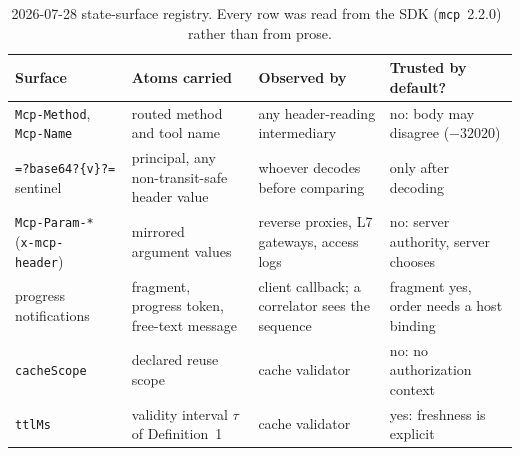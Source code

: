 \begin{table}[t]
  \caption{2026-07-28 state-surface registry. Every row was read from the SDK
  (\texttt{mcp}~2.2.0)~\cite{mcpsdk} rather than from prose.}
  \label{tab:registry}
  \centering\scriptsize
  \setlength{\tabcolsep}{3pt}
  \begin{tabular}{@{}>{\raggedright\arraybackslash}p{}>{\raggedright\arraybackslash}p{}>{\raggedright\arraybackslash}p{}>{\raggedright\arraybackslash}p{}@{}}
    \toprule
    Surface & Atoms carried & Observed by & Trusted by default? \\
    \midrule
    \texttt{Mcp-Method}, \texttt{Mcp-Name}~\cite{mcptransport} & routed method and tool name & any header-reading intermediary & no: body may disagree ($-32020$) \\
    \texttt{=?base64?\{v\}?=} sentinel~\cite{mcptransport} & principal, any non-transit-safe header value & whoever decodes before comparing & only after decoding \\
    \texttt{Mcp-Param-*} (\texttt{x-mcp-header})~\cite{mcptransport} & mirrored argument values & reverse proxies, L7 gateways, access logs & no: server authority, server chooses \\
    progress notifications~\cite{mcpprogress} & fragment, progress token, free-text message & client callback; a correlator sees the sequence & fragment yes, order needs a host binding \\
    \texttt{cacheScope}~\cite{mcpcache} & declared reuse scope & cache validator & no: no authorization context \\
    \texttt{ttlMs}~\cite{mcpcache} & validity interval $\tau$ of Definition~1 & cache validator & yes: freshness is explicit \\
    \bottomrule
  \end{tabular}
\end{table}
